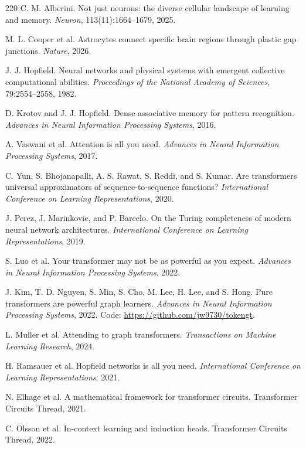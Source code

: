 \documentclass[11pt]{article}
\newcommand{\1}{\mathbf{1}}
\begin{document}
\begin{thebibliography}{220}
C. M. Alberini. Not just neurons: the diverse cellular landscape of learning and memory. \emph{Neuron}, 113(11):1664--1679, 2025.

M. L. Cooper et al. Astrocytes connect specific brain regions through plastic gap junctions. \emph{Nature}, 2026.

J. J. Hopfield. Neural networks and physical systems with emergent collective computational abilities. \emph{Proceedings of the National Academy of Sciences}, 79:2554--2558, 1982.

D. Krotov and J. J. Hopfield. Dense associative memory for pattern recognition. \emph{Advances in Neural Information Processing Systems}, 2016.

A. Vaswani et al. Attention is all you need. \emph{Advances in Neural Information Processing Systems}, 2017.

C. Yun, S. Bhojanapalli, A. S. Rawat, S. Reddi, and S. Kumar. Are transformers universal approximators of sequence-to-sequence functions? \emph{International Conference on Learning Representations}, 2020.

J. Perez, J. Marinkovic, and P. Barcelo. On the Turing completeness of modern neural network architectures. \emph{International Conference on Learning Representations}, 2019.

S. Luo et al. Your transformer may not be as powerful as you expect. \emph{Advances in Neural Information Processing Systems}, 2022.

J. Kim, T. D. Nguyen, S. Min, S. Cho, M. Lee, H. Lee, and S. Hong. Pure transformers are powerful graph learners. \emph{Advances in Neural Information Processing Systems}, 2022. Code: \url{https://github.com/jw9730/tokengt}.

L. Muller et al. Attending to graph transformers. \emph{Transactions on Machine Learning Research}, 2024.

H. Ramsauer et al. Hopfield networks is all you need. \emph{International Conference on Learning Representations}, 2021.

N. Elhage et al. A mathematical framework for transformer circuits. Transformer Circuits Thread, 2021.

C. Olsson et al. In-context learning and induction heads. Transformer Circuits Thread, 2022.


\end{thebibliography}
\end{document}
